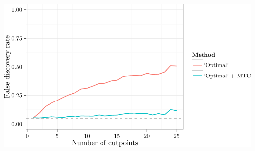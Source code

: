 \documentclass{article}\usepackage[]{graphicx}\usepackage[]{color}
\makeatletter
\def\maxwidth{ %
  \ifdim\Gin@nat@width>\linewidth
    \linewidth
  \else
    \Gin@nat@width
  \fi
}
\newenvironment{knitrout}{}{} %
\makeatother
\begin{document}
\begin{knitrout}
{\centering \includegraphics[width=\maxwidth]{figure/06-E2B-E2B-plots-3} 

}



\end{knitrout}
\end{document}
